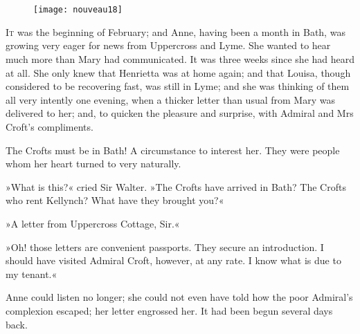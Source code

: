 \chapter[Chapter \thechapter]{}
	
	\begin{figure}[t!]
\centering
\texttt{[image: nouveau18]}
\end{figure}

\lettrine[lines=4,lraise=0.3]{I}{t} was the beginning of February; and Anne, having been a month in Bath, was growing very eager for news from Uppercross and Lyme. She wanted to hear much more than Mary had communicated. It was three weeks since she had heard at all. She only knew that Henrietta was at home again; and that Louisa, though considered to be recovering fast, was still in Lyme; and she was thinking of them all very intently one evening, when a thicker letter than usual from Mary was delivered to her; and, to quicken the pleasure and surprise, with Admiral and Mrs Croft's compliments.

The Crofts must be in Bath! A circumstance to interest her. They were people whom her heart turned to very naturally.

»What is this?« cried Sir Walter. »The Crofts have arrived in Bath? The Crofts who rent Kellynch? What have they brought you?«

»A letter from Uppercross Cottage, Sir.«

»Oh! those letters are convenient passports. They secure an introduction. I should have visited Admiral Croft, however, at any rate. I know what is due to my tenant.«

Anne could listen no longer; she could not even have told how the poor Admiral's complexion escaped; her letter engrossed her. It had been begun several days back.

